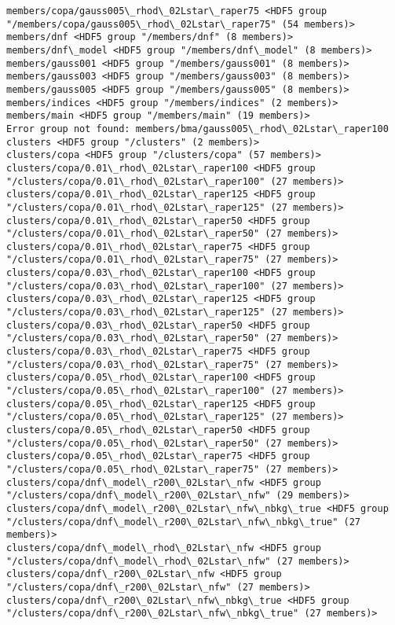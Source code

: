 \documentclass[11pt]{article}
\begin{document}
\begin{Verbatim}[commandchars=\\\{\}]
members/copa/gauss005\_rhod\_02Lstar\_raper75 <HDF5 group "/members/copa/gauss005\_rhod\_02Lstar\_raper75" (54 members)>
members/dnf <HDF5 group "/members/dnf" (8 members)>
members/dnf\_model <HDF5 group "/members/dnf\_model" (8 members)>
members/gauss001 <HDF5 group "/members/gauss001" (8 members)>
members/gauss003 <HDF5 group "/members/gauss003" (8 members)>
members/gauss005 <HDF5 group "/members/gauss005" (8 members)>
members/indices <HDF5 group "/members/indices" (2 members)>
members/main <HDF5 group "/members/main" (19 members)>
Error group not found: members/bma/gauss005\_rhod\_02Lstar\_raper100
clusters <HDF5 group "/clusters" (2 members)>
clusters/copa <HDF5 group "/clusters/copa" (57 members)>
clusters/copa/0.01\_rhod\_02Lstar\_raper100 <HDF5 group "/clusters/copa/0.01\_rhod\_02Lstar\_raper100" (27 members)>
clusters/copa/0.01\_rhod\_02Lstar\_raper125 <HDF5 group "/clusters/copa/0.01\_rhod\_02Lstar\_raper125" (27 members)>
clusters/copa/0.01\_rhod\_02Lstar\_raper50 <HDF5 group "/clusters/copa/0.01\_rhod\_02Lstar\_raper50" (27 members)>
clusters/copa/0.01\_rhod\_02Lstar\_raper75 <HDF5 group "/clusters/copa/0.01\_rhod\_02Lstar\_raper75" (27 members)>
clusters/copa/0.03\_rhod\_02Lstar\_raper100 <HDF5 group "/clusters/copa/0.03\_rhod\_02Lstar\_raper100" (27 members)>
clusters/copa/0.03\_rhod\_02Lstar\_raper125 <HDF5 group "/clusters/copa/0.03\_rhod\_02Lstar\_raper125" (27 members)>
clusters/copa/0.03\_rhod\_02Lstar\_raper50 <HDF5 group "/clusters/copa/0.03\_rhod\_02Lstar\_raper50" (27 members)>
clusters/copa/0.03\_rhod\_02Lstar\_raper75 <HDF5 group "/clusters/copa/0.03\_rhod\_02Lstar\_raper75" (27 members)>
clusters/copa/0.05\_rhod\_02Lstar\_raper100 <HDF5 group "/clusters/copa/0.05\_rhod\_02Lstar\_raper100" (27 members)>
clusters/copa/0.05\_rhod\_02Lstar\_raper125 <HDF5 group "/clusters/copa/0.05\_rhod\_02Lstar\_raper125" (27 members)>
clusters/copa/0.05\_rhod\_02Lstar\_raper50 <HDF5 group "/clusters/copa/0.05\_rhod\_02Lstar\_raper50" (27 members)>
clusters/copa/0.05\_rhod\_02Lstar\_raper75 <HDF5 group "/clusters/copa/0.05\_rhod\_02Lstar\_raper75" (27 members)>
clusters/copa/dnf\_model\_r200\_02Lstar\_nfw <HDF5 group "/clusters/copa/dnf\_model\_r200\_02Lstar\_nfw" (29 members)>
clusters/copa/dnf\_model\_r200\_02Lstar\_nfw\_nbkg\_true <HDF5 group "/clusters/copa/dnf\_model\_r200\_02Lstar\_nfw\_nbkg\_true" (27 members)>
clusters/copa/dnf\_model\_rhod\_02Lstar\_nfw <HDF5 group "/clusters/copa/dnf\_model\_rhod\_02Lstar\_nfw" (27 members)>
clusters/copa/dnf\_r200\_02Lstar\_nfw <HDF5 group "/clusters/copa/dnf\_r200\_02Lstar\_nfw" (27 members)>
clusters/copa/dnf\_r200\_02Lstar\_nfw\_nbkg\_true <HDF5 group "/clusters/copa/dnf\_r200\_02Lstar\_nfw\_nbkg\_true" (27 members)>

\end{Verbatim}
\end{document}
